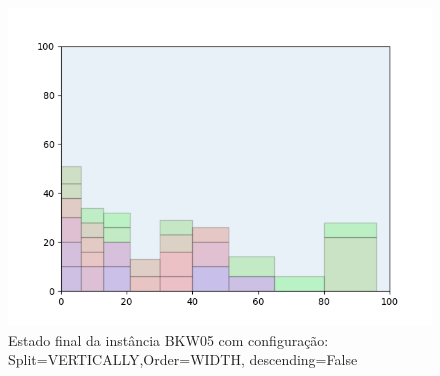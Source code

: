 \begin{figure}[H]
    \centering
    \caption[]{Estado final da instância BKW05 com configuração: Split=VERTICALLY,Order=WIDTH, descending=False}
    \label{fig:bkw05-vertically-width-false}
    \includegraphics[scale=0.5]{output/figures/bkw/bkw05/vertically/width/false/00}
\end{figure}